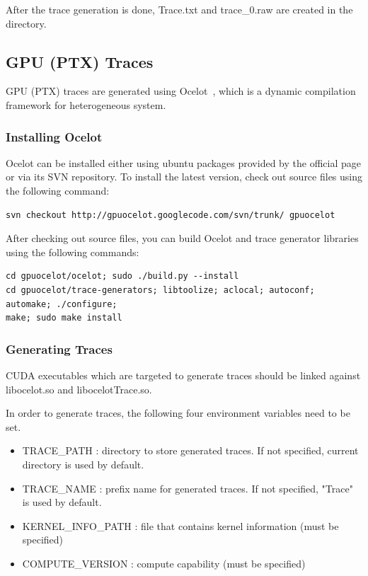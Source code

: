 After the trace generation is done, Trace.txt and trace\_0.raw are created in the directory.

\subsection{GPU (PTX) Traces}
\label{sec:gpu_traces}

GPU (PTX) traces are generated using Ocelot~\cite{ocelot}, which is a dynamic compilation
framework for heterogeneous system. 

\subsubsection{Installing Ocelot}

Ocelot can be installed either using ubuntu packages provided by the official
page or via its SVN repository. To install the latest version, check out 
source files using the following command:

\smallskip
\begin{lstlisting}
svn checkout http://gpuocelot.googlecode.com/svn/trunk/ gpuocelot
\end{lstlisting}
\smallskip

After checking out source files, you can build Ocelot and trace generator libraries using the following commands:

\smallskip
\begin{lstlisting}
cd gpuocelot/ocelot; sudo ./build.py --install
cd gpuocelot/trace-generators; libtoolize; aclocal; autoconf; automake; ./configure; 
make; sudo make install
\end{lstlisting}
\smallskip

\subsubsection{Generating Traces}

CUDA executables which are targeted to generate traces should be linked against
libocelot.so and libocelotTrace.so.

In order to generate traces, the following four environment variables need to be set.

\begin{itemize}\itemsep2pt
\item TRACE\_PATH : directory to store generated traces. If not specified, current directory is used by default.
\item TRACE\_NAME : prefix name for generated traces. If not specified, "Trace" is used by default.
\item KERNEL\_INFO\_PATH : file that contains kernel information (must be specified)
\item COMPUTE\_VERSION : compute capability (must be specified)
\end{itemize}

